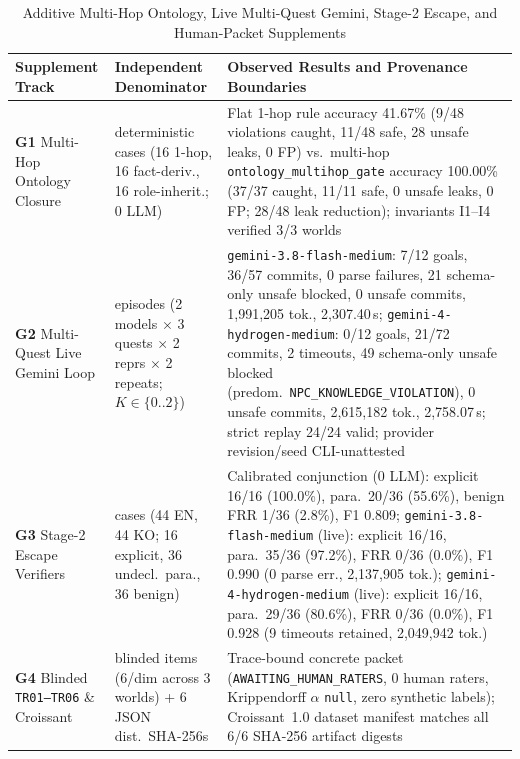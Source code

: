 \documentclass[journal]{IEEEtran}
\renewcommand{\arraystretch}{1.20}
\begin{document}
\begin{table}[!tbp]
\caption{Additive Multi-Hop Ontology, Live Multi-Quest Gemini, Stage-2 Escape, and Human-Packet Supplements}
\label{tab:green-supplements}
\centering
\small
\renewcommand{\arraystretch}{1.20}
\begin{tabularx}{\textwidth}{@{}>{\raggedright\arraybackslash}p{} >{\raggedright\arraybackslash}p{} >{\raggedright\arraybackslash}X@{}}
\toprule
\textbf{Supplement Track} & \textbf{Independent Denominator} & \textbf{Observed Results and Provenance Boundaries} \\
\midrule
\textbf{G1} Multi-Hop Ontology Closure & 48 deterministic cases (16 1-hop, 16 fact-deriv., 16 role-inherit.; 0 LLM) & Flat 1-hop rule accuracy 41.67\% (9/48 violations caught, 11/48 safe, 28 unsafe leaks, 0 FP) vs.\ multi-hop \texttt{ontology\_}\allowbreak\texttt{multihop\_}\allowbreak\texttt{gate} accuracy 100.00\% (37/37 caught, 11/11 safe, 0 unsafe leaks, 0 FP; 28/48 leak reduction); invariants I1--I4 verified 3/3 worlds \\
\textbf{G2} Multi-Quest Live Gemini Loop & 24 episodes (2 models $\times$ 3 quests $\times$ 2 reprs $\times$ 2 repeats; $K{\in}\{0..2\}$) & \texttt{gemini-3.8-}\allowbreak\texttt{flash-}\allowbreak\texttt{medium}: 7/12 goals, 36/57 commits, 0 parse failures, 21 schema-only unsafe blocked, 0 unsafe commits, 1,991,205 tok., 2,307.40\,s; \texttt{gemini-4-}\allowbreak\texttt{hydrogen-}\allowbreak\texttt{medium}: 0/12 goals, 21/72 commits, 2 timeouts, 49 schema-only unsafe blocked (predom.\ \texttt{NPC\_}\allowbreak\texttt{KNOWLEDGE\_}\allowbreak\texttt{VIOLATION}), 0 unsafe commits, 2,615,182 tok., 2,758.07\,s; strict replay 24/24 valid; provider revision/seed CLI-unattested \\
\textbf{G3} Stage-2 Escape Verifiers & 88 cases (44 EN, 44 KO; 16 explicit, 36 undecl.\ para., 36 benign) & Calibrated conjunction (0 LLM): explicit 16/16 (100.0\%), para.\ 20/36 (55.6\%), benign FRR 1/36 (2.8\%), F1 0.809; \texttt{gemini-3.8-}\allowbreak\texttt{flash-}\allowbreak\texttt{medium} (live): explicit 16/16, para.\ 35/36 (97.2\%), FRR 0/36 (0.0\%), F1 0.990 (0 parse err., 2,137,905 tok.); \texttt{gemini-4-}\allowbreak\texttt{hydrogen-}\allowbreak\texttt{medium} (live): explicit 16/16, para.\ 29/36 (80.6\%), FRR 0/36 (0.0\%), F1 0.928 (9 timeouts retained, 2,049,942 tok.) \\
\textbf{G4} Blinded \texttt{TR01--TR06} \& Croissant & 36 blinded items (6/dim across 3 worlds) + 6 JSON dist.\ SHA-256s & Trace-bound concrete packet (\texttt{AWAITING\_}\allowbreak\texttt{HUMAN\_}\allowbreak\texttt{RATERS}, 0 human raters, Krippendorff $\alpha$ \texttt{null}, zero synthetic labels); Croissant~1.0 dataset manifest matches all 6/6 SHA-256 artifact digests \\
\bottomrule
\end{tabularx}
\end{table}
\end{document}

